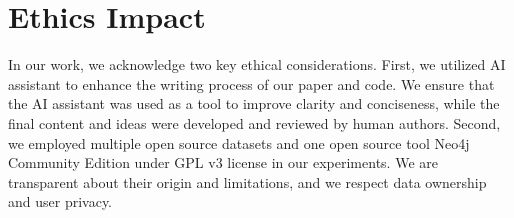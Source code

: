 \section{Ethics Impact}
In our work, we acknowledge two key ethical considerations. First, we utilized AI assistant to enhance the writing process of our paper and code. We ensure that the AI assistant was used as a tool to improve clarity and conciseness, while the final content and ideas were developed and reviewed by human authors. Second, we employed multiple open source datasets and one open source tool Neo4j Community Edition\citep{10.1145/2384716.2384777} under GPL v3 license in our experiments. We are transparent about their origin and limitations, and we respect data ownership and user privacy. 








